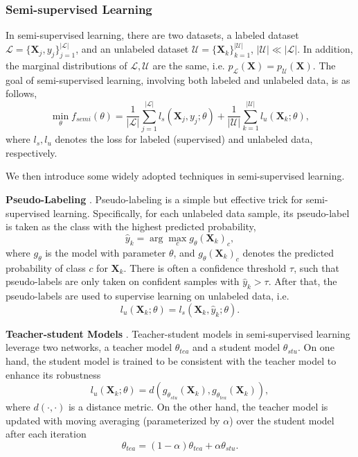 \documentclass[11pt]{article}
\begin{document}
\subsubsection{Semi-supervised Learning}\label{sec:prelim-semi}
In semi-supervised learning, there are two datasets, a labeled dataset $\mathcal{L} = \{\mathbf{X}_j, y_j\}_{j=1}^{|\mathcal{L}|}$, and an unlabeled dataset $\mathcal{U} = \{\mathbf{X}_k\}_{k=1}^{|\mathcal{U}|}$, $|\mathcal{U}|\ll |\mathcal{L}|$. In addition, the marginal distributions of $\mathcal{L}, \mathcal{U}$ are the same, i.e. $p_\mathcal{L}(\mathbf{X})=p_\mathcal{U}(\mathbf{X})$. The goal of semi-supervised learning, involving both labeled and unlabeled data, is as follows,
\begin{equation}
\min_\theta f_{semi}(\theta) = \frac{1}{|\mathcal{L}|}\sum_{j=1}^{|\mathcal{L}|}l_s(\mathbf{X}_j, y_j;\theta)+\frac{1}{|\mathcal{U}|}\sum_{k=1}^{|\mathcal{U}|}l_u(\mathbf{X}_k;\theta),
\label{eqn:semi}
\end{equation}
where $l_s, l_u$ denotes the loss for labeled (supervised) and unlabeled data, respectively.

We then introduce some widely adopted techniques in semi-supervised learning.

\textbf{Pseudo-Labeling} \cite{Yilun-lee2013pseudo}. Pseudo-labeling is a simple but effective trick for semi-supervised learning. Specifically, for each unlabeled data sample, its pseudo-label is taken as the class with the highest predicted probability,
\begin{equation}
    \hat{y}_k = \arg\max_{c} g_\theta(\mathbf{X}_k)_c,
\end{equation}
where $g_\theta$ is the model with parameter $\theta$, and $g_\theta(\mathbf{X}_k)_c$ denotes the predicted probability of class $c$ for $\mathbf{X}_k$. There is often a confidence threshold $\tau$, such that pseudo-labels are only taken on confident samples with $\hat{y}_k>\tau$. After that, the pseudo-labels are used to supervise learning on unlabeled data, i.e.
\begin{equation}
    l_u(\mathbf{X}_k;\theta) = l_s(\mathbf{X}_k, \hat{y}_k;\theta).
\end{equation}

\textbf{Teacher-student Models} \cite{Yilun-tarvainen2017mean}. Teacher-student models in semi-supervised learning leverage two networks, a teacher model $\theta_{tea}$ and a student model $\theta_{stu}$. On one hand, the student model is trained to be consistent with the teacher model to enhance its robustness
\begin{equation}
    l_u(\mathbf{X}_k;\theta) = d\left(g_{\theta_{stu}}(\mathbf{X}_k), g_{\theta_{tea}}(\mathbf{X}_k)\right),
\end{equation}
where $d(\cdot, \cdot)$ is a distance metric. On the other hand, the teacher model is updated with moving averaging (parameterized by $\alpha$) over the student model after each iteration
\begin{equation}
\theta_{tea} =(1-\alpha)\theta_{tea} + \alpha \theta_{stu}.
\label{eqn:ema}
\end{equation}
\end{document}
